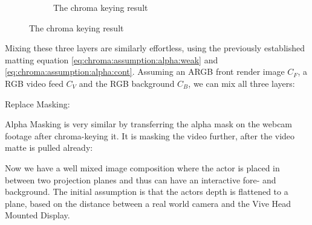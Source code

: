 \begin{figure}[htbp]
\begin{subfigure}[t]{.45\textwidth}
		\caption{The chroma keying result}
	\end{subfigure}
\end{figure}

Mixing these three layers are similarly effortless, using the previously 
established matting equation \eqref{eq:chroma:assumption:alpha:weak} and 
\eqref{eq:chroma:assumption:alpha:cont}. Assuming an ARGB front render image 
$C_F$, a RGB video feed  $C_V$ and the RGB background $C_B$, 
we can mix all three layers:

Replace Masking:







Alpha Masking is very similar by transferring the alpha mask on the webcam 
footage after chroma-keying it. It is masking the video further, after the 
video matte is pulled already:






Now we have a well mixed image composition where the actor is placed in between 
two projection planes and thus can have an interactive fore- and background. 
The initial assumption is that the actors depth is flattened to a plane, based 
on the distance between a real world camera and the Vive Head Mounted Display.